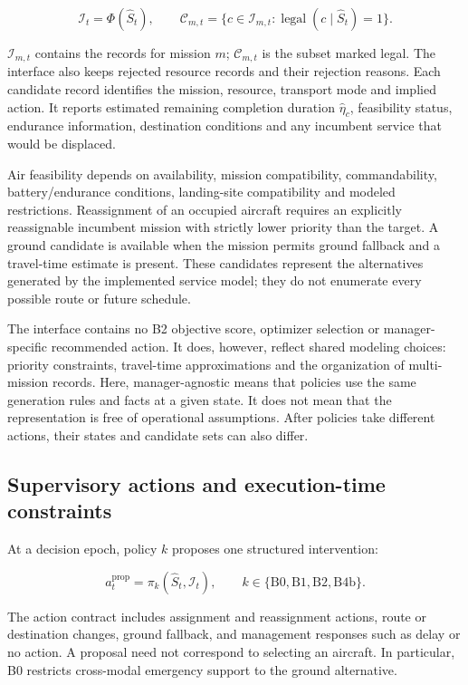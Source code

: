 \documentclass[]{interact}
\theoremstyle{plain}
\theoremstyle{definition}
\theoremstyle{remark}
\begin{document}
\begin{equation*}
\mathcal I_t=\Phi(\widehat S_t),\qquad
\mathcal C_{m,t}=\{c\in\mathcal I_{m,t}:\operatorname{legal}(c\mid\widehat S_t)=1\}. \tag{3}
\end{equation*}

$\mathcal I_{m,t}$ contains the records for mission $m$; $\mathcal C_{m,t}$ is the subset marked legal. The interface also keeps rejected resource records and their rejection reasons. Each candidate record identifies the mission, resource, transport mode and implied action. It reports estimated remaining completion duration $\widehat\eta_c$, feasibility status, endurance information, destination conditions and any incumbent service that would be displaced.

Air feasibility depends on availability, mission compatibility, commandability, battery/endurance conditions, landing-site compatibility and modeled restrictions. Reassignment of an occupied aircraft requires an explicitly reassignable incumbent mission with strictly lower priority than the target. A ground candidate is available when the mission permits ground fallback and a travel-time estimate is present. These candidates represent the alternatives generated by the implemented service model; they do not enumerate every possible route or future schedule.

The interface contains no B2 objective score, optimizer selection or manager-specific recommended action. It does, however, reflect shared modeling choices: priority constraints, travel-time approximations and the organization of multi-mission records. Here, manager-agnostic means that policies use the same generation rules and facts at a given state. It does not mean that the representation is free of operational assumptions. After policies take different actions, their states and candidate sets can also differ.

\subsection{Supervisory actions and execution-time constraints}

At a decision epoch, policy $k$ proposes one structured intervention:

\begin{equation*}
a_t^{\mathrm{prop}}=\pi_k(\widehat S_t,\mathcal I_t),\qquad
k\in\{\mathrm{B0,B1,B2,B4b}\}. \tag{4}
\end{equation*}

The action contract includes assignment and reassignment actions, route or destination changes, ground fallback, and management responses such as delay or no action. A proposal need not correspond to selecting an aircraft. In particular, B0 restricts cross-modal emergency support to the ground alternative.
\end{document}
